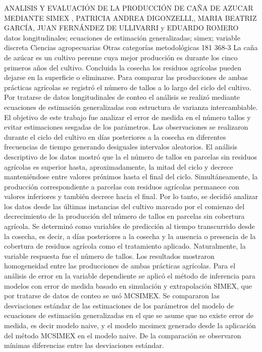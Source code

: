 \A
{ANALISIS Y EVALUACIÓN DE LA PRODUCCIÓN DE CAÑA DE AZUCAR MEDIANTE SIMEX}
{, PATRICIA ANDREA DIGONZELLI,, MARIA BEATRIZ GARCÍA, JUAN FERNÁNDEZ DE ULLIVARRI y EDUARDO ROMERO}
{
\\}
{datos longitudinales; ecuaciones de estimación generalizadas; simex; variable discreta} 
 {Ciencias agropecuarias} 
 {Otras categorías metodológicas} 
 {181} 
 {368-3}
{La caña de azúcar es un cultivo perenne cuya mejor producción es durante los cinco primeros años del cultivo. Concluida la cosecha los residuos agrícolas pueden dejarse en la superficie o eliminarse. Para comparar las producciones de ambas prácticas agrícolas se registró el número de tallos a lo largo del ciclo del cultivo. Por tratarse de datos longitudinales de conteo el análisis se realizó mediante ecuaciones de estimación generalizadas con estructura de varianza intercambiable. El objetivo de este trabajo fue analizar el error de medida en el número tallos y evitar estimaciones sesgadas de los parámetros. Las observaciones se realizaron durante el ciclo del cultivo en días posteriores a la cosecha en diferentes frecuencias de tiempo generando desiguales intervalos aleatorios. El análisis descriptivo de los datos mostró que la el número de tallos en parcelas sin residuos agrícolas es superior hasta, aproximadamente, la mitad del ciclo y decrece manteniéndose entre valores próximos hasta el final del ciclo. Simultáneamente, la producción correspondiente a parcelas con residuos agrícolas permanece con valores inferiores y también decrece hacia el final. Por lo tanto, se decidió analizar los datos desde las últimas instancias del cultivo marcado por el comienzo del decrecimiento de la producción del número de tallos en parcelas sin cobertura agrícola. Se determinó como variables de predicción al tiempo transcurrido desde la cosecha, es decir, a días posteriores a la cosecha y la ausencia o presencia de la cobertura de residuos agrícola como el tratamiento aplicado. Naturalmente, la variable respuesta fue el número de tallos. Los resultados mostraron homogeneidad entre las producciones de ambas prácticas agrícolas. Para el análisis de error en la variable dependiente se aplicó el método de inferencia para modelos con error de medida basado en simulación y extrapolación SIMEX, que por tratarse de datos de conteo se usó MCSIMEX. Se compararon las desviaciones estándar de las estimaciones de los parámetros del modelo de ecuaciones de estimación generalizadas en el que se asume que no existe error de medida, es decir modelo naive, y el modelo mcsimex generado desde la aplicación del método MCSIMEX en el modelo naive. De la comparación se observaron mínimas diferencias entre las desviaciones estándar.}

